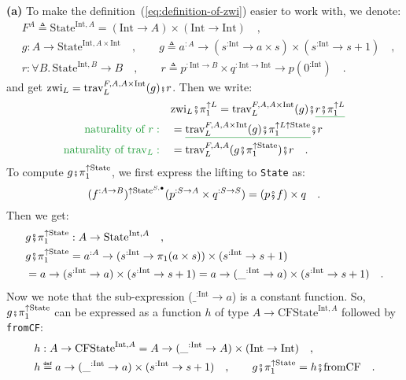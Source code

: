 \textbf{(a)} To make the definition~(\ref{eq:definition-of-zwi})
easier to work with, we denote:
\begin{align*}
 & F^{A}\triangleq\text{State}^{\text{Int},A}=(\text{Int}\rightarrow A)\times(\text{Int}\rightarrow\text{Int})\quad,\\
 & g:A\rightarrow\text{State}^{\text{Int},A\times\text{Int}}\quad,\quad\quad g\triangleq a^{:A}\rightarrow(s^{:\text{Int}}\rightarrow a\times s)\times(s^{:\text{Int}}\rightarrow s+1)\quad,\\
 & r:\forall B.\,\text{State}^{\text{Int},B}\rightarrow B\quad,\quad\quad r\triangleq p^{:\text{Int}\rightarrow B}\times q^{:\text{Int}\rightarrow\text{Int}}\rightarrow p(0^{:\text{Int}})\quad.
\end{align*}
and get $\text{zwi}_{L}=\text{trav}_{L}^{F,A,A\times\text{Int}}(g)\bef r$.
Then we write:
\begin{align*}
 & \text{zwi}_{L}\bef\pi_{1}^{\uparrow L}=\text{trav}_{L}^{F,A,A\times\text{Int}}(g)\bef\gunderline{r\bef\pi_{1}^{\uparrow L}}\\
{\color{greenunder}\text{naturality of }r:}\quad & =\gunderline{\text{trav}_{L}^{F,A,A\times\text{Int}}(g)\bef\pi_{1}^{\uparrow L\uparrow\text{State}}}\bef r\\
{\color{greenunder}\text{naturality of }\text{trav}_{L}:}\quad & =\text{trav}_{L}^{F,A,A}(g\bef\pi_{1}^{\uparrow\text{State}})\bef r\quad.
\end{align*}
To compute $g\bef\pi_{1}^{\uparrow\text{State}}$, we first express
the lifting to \lstinline!State! as:
\[
(f^{:A\rightarrow B})^{\uparrow\text{State}^{S,\bullet}}(p^{:S\rightarrow A}\times q^{:S\rightarrow S})=(p\bef f)\times q\quad.
\]
Then we get:
\begin{align*}
 & g\bef\pi_{1}^{\uparrow\text{State}}:A\rightarrow\text{State}^{\text{Int},A}\quad,\\
 & g\bef\pi_{1}^{\uparrow\text{State}}=a^{:A}\rightarrow(s^{:\text{Int}}\rightarrow\pi_{1}(a\times s))\times(s^{:\text{Int}}\rightarrow s+1)\\
 & =a\rightarrow(s^{:\text{Int}}\rightarrow a)\times(s^{:\text{Int}}\rightarrow s+1)=a\rightarrow(\_^{:\text{Int}}\rightarrow a)\times(s^{:\text{Int}}\rightarrow s+1)\quad.
\end{align*}
Now we note that the sub-expression ($\_^{:\text{Int}}\rightarrow a$)
is a constant function. So, $g\bef\pi_{1}^{\uparrow\text{State}}$
can be expressed as a function $h$ of type $A\rightarrow\text{CFState}^{\text{Int},A}$
followed by \lstinline!fromCF!:
\begin{align*}
 & h:A\rightarrow\text{CFState}^{\text{Int},A}=A\rightarrow(\_^{:\text{Int}}\rightarrow A)\times(\text{Int}\rightarrow\text{Int})\quad,\\
 & h\triangleq a\rightarrow(\_^{:\text{Int}}\rightarrow a)\times(s^{:\text{Int}}\rightarrow s+1)\quad,\quad\quad g\bef\pi_{1}^{\uparrow\text{State}}=h\bef\text{fromCF}\quad.
\end{align*}

